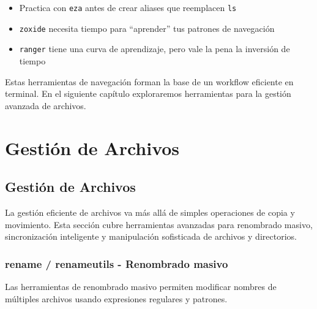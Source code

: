 \documentclass[
  11pt,
  letterpaper,
  oneside,
  openany]{scrbook}
\providecommand{\tightlist}{%
  \setlength{\itemsep}{0pt}\setlength{\parskip}{0pt}}
\begin{document}
\begin{tcolorbox}[enhanced jigsaw, coltitle=black, breakable, arc=.35mm, toprule=.15mm, colbacktitle=quarto-callout-important-color!10!white, colframe=quarto-callout-important-color-frame, opacityback=0, colback=white, bottomtitle=1mm, bottomrule=.15mm, rightrule=.15mm, left=2mm, toptitle=1mm, leftrule=.75mm, title=\textcolor{quarto-callout-important-color}{\faExclamation}\hspace{0.5em}{Importante para nuevos usuarios}, titlerule=0mm, opacitybacktitle=0.6]

\begin{itemize}
\tightlist
\item
  Practica con \texttt{eza} antes de crear aliases que reemplacen
  \texttt{ls}
\item
  \texttt{zoxide} necesita tiempo para ``aprender'' tus patrones de
  navegación
\item
  \texttt{ranger} tiene una curva de aprendizaje, pero vale la pena la
  inversión de tiempo
\end{itemize}

\end{tcolorbox}

Estas herramientas de navegación forman la base de un workflow eficiente
en terminal. En el siguiente capítulo exploraremos herramientas para la
gestión avanzada de archivos.

\part{Gestión de Archivos}

\chapter{Gestión de Archivos}\label{gestiuxf3n-de-archivos-3}

La gestión eficiente de archivos va más allá de simples operaciones de
copia y movimiento. Esta sección cubre herramientas avanzadas para
renombrado masivo, sincronización inteligente y manipulación sofisticada
de archivos y directorios.

\section{rename / renameutils - Renombrado masivo}\label{sec-rename}

Las herramientas de renombrado masivo permiten modificar nombres de
múltiples archivos usando expresiones regulares y patrones.
\end{document}
